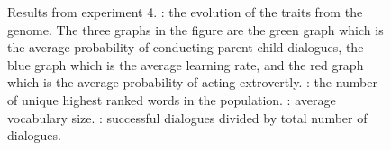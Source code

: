 \begin{figure}
    \centering
    \ContinuedFloat
    \hfill
    \par \bigskip
    \hfill
    \caption{Results from experiment 4. : the evolution of the traits from the genome. The three graphs in the figure are the green graph which is the average probability of conducting parent-child dialogues, the blue graph which is the average learning rate, and the  red graph which is the average probability of acting extrovertly. : the number of unique highest ranked words in the population. : average vocabulary size. : successful dialogues divided by total number of dialogues.}
    \label{fig:exp4.1}
\end{figure}

